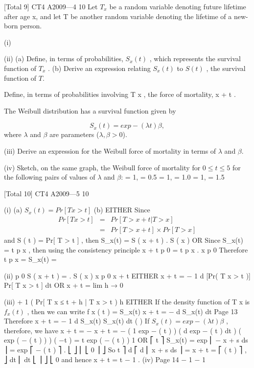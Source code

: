 \documentclass[a4paper,12pt]{article}
\begin{document}
[Total 9]
CT4 A2009—4
10
Let $T_x$ be a random variable denoting future lifetime after age x, and let T be
another random variable denoting the lifetime of a new-born person.
\item (i)
\item (ii)
(a) Define, in terms of probabilities, $S_x(t)$ , which represents the survival
function of $T_x$ .
(b) Derive an expression relating $S_x(t)$ to $S ( t )$ , the survival function of $T$.

Define, in terms of probabilities involving T x , the force of mortality, \mu x + t .

The Weibull distribution has a survival function given by

\[
S_x(t) = exp − ( \lambda t ) \beta ,
\]
where $\lambda$ and $\beta$ are parameters ($\lambda, \beta > 0$).
\item (iii)
Derive an expression for the Weibull force of mortality in terms of $\lambda$ and $\beta$.

(iv)
Sketch, on the same graph, the Weibull force of mortality for $0 \leq t \leq 5$ for the
following pairs of values of $\lambda$ and $\beta$:
\lambda = 1, \beta = 0.5
\lambda = 1, \beta = 1.0
\lambda = 1, \beta = 1.5

[Total 10]
CT4 A2009—5
10
\item (i)
(a) $S_x(t) = Pr[ T x > t ]$
(b) EITHER
Since 
\begin{eqnarray*} Pr[ T x > t ] &=& Pr[ T > x + t | T > x ] \\ &=&
Pr[ T > x + t ] \times
Pr[ T > x ]
\end{eqnarray*}
and S ( t ) = Pr[ T > t ] ,
then S_x(t) =
S ( x + t )
.
S ( x )
OR
Since S_x(t) = t p x , then using the consistency principle
x + t p 0 = t p x . x p 0
Therefore t p x = S_x(t) =
\item (ii)
p 0 S ( x + t )
=
.
S ( x )
x p 0
x + t
EITHER
\mu x + t = −
1
d
[Pr( T x > t )]
Pr[ T x > t ] dt
OR
\mu x + t = lim
h → 0
\item (iii)
+
1
( Pr[ T x ≤ t + h | T x > t )
h
EITHER
If the density function of T x is $f_x ( t )$ , then we can write
f x ( t ) = S_x(t) \mu x + t = −
d
S_x(t)
dt
Page 13%
Therefore \mu x + t = −
1 d
S_x(t)
S_x(t) dt
(
)
If $S_x(t) = exp − ( \lambda t ) \beta$ , therefore, we have
\mu x + t = −
\mu x + t = −
(
1
exp − ( \lambda t ) \beta
)
(
d
exp − ( \lambda t ) \beta
dt
)
( exp ( − ( \lambda t ) ) ) ( −\lambda \beta t ) = \lambda \beta t
exp ( − ( \lambda t ) )
1
\beta
\beta
OR
⎡ t
⎤
S_x(t) = exp ⎢ − \int \mu x + s ds ⎥ = exp ⎡ − ( \lambda t ) \beta ⎤ .
⎣
⎦
⎢ ⎣ 0
⎥ ⎦
So
t
⎤
d ⎡
d
⎢ \int \mu x + s ds ⎥ = \mu x + t = ⎡ ( \lambda t ) \beta ⎤ ,
⎦
dt ⎢
dt ⎣
⎥ ⎦
⎣ 0
and hence
\mu x + t = \beta\lambda \beta t \beta− 1 .
(iv)
Page 14
\beta
\beta− 1
\beta
\beta− 1%
\end{document}
